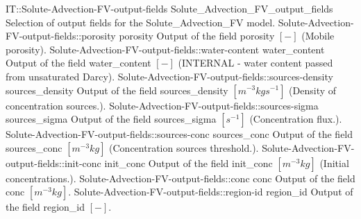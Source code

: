\begin{SelectionType}
	{IT::Solute-Advection-FV-output-fields}
	{Solute{\_}Advection{\_}FV{\_}output{\_}fields}
	{{{Selection of output fields for the Solute{\_}Advection{\_}FV model.}}}
		\SelectionItem
			{Solute-Advection-FV-output-fields::porosity}
			{porosity}
			{{{Output of the field porosity }{$[-]$}{ (Mobile porosity).}}}
		\SelectionItem
			{Solute-Advection-FV-output-fields::water-content}
			{water{\_}content}
			{{{Output of the field water{\_}content }{$[-]$}{ (INTERNAL - water content passed from unsaturated Darcy).}}}
		\SelectionItem
			{Solute-Advection-FV-output-fields::sources-density}
			{sources{\_}density}
			{{{Output of the field sources{\_}density }{$[m^{-3}kgs^{-1}]$}{ (Density of concentration sources.).}}}
		\SelectionItem
			{Solute-Advection-FV-output-fields::sources-sigma}
			{sources{\_}sigma}
			{{{Output of the field sources{\_}sigma }{$[s^{-1}]$}{ (Concentration flux.).}}}
		\SelectionItem
			{Solute-Advection-FV-output-fields::sources-conc}
			{sources{\_}conc}
			{{{Output of the field sources{\_}conc }{$[m^{-3}kg]$}{ (Concentration sources threshold.).}}}
		\SelectionItem
			{Solute-Advection-FV-output-fields::init-conc}
			{init{\_}conc}
			{{{Output of the field init{\_}conc }{$[m^{-3}kg]$}{ (Initial concentrations.).}}}
		\SelectionItem
			{Solute-Advection-FV-output-fields::conc}
			{conc}
			{{{Output of the field conc }{$[m^{-3}kg]$}{.}}}
		\SelectionItem
			{Solute-Advection-FV-output-fields::region-id}
			{region{\_}id}
			{{{Output of the field region{\_}id }{$[-]$}{.}}}
\end{SelectionType}
